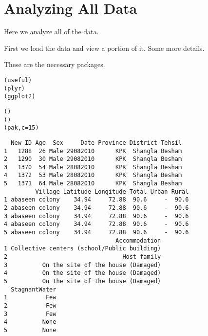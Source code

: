 \documentclass{article}
\title{\myTitle}
\author{Richard Garfield\\ Columbia University School of Nursing \and Jared P. Lander\\ JP Lander Consulting}
\begin{document}


\section{Analyzing All Data}
\label{sec:overall}
Here we analyze all of the data.

First we load the data and view a portion of it. Some more details.

These are the necessary packages.
\begin{knitrout}
\color{fgcolor}\begin{kframe}
\begin{alltt}
(useful)
(plyr)
(ggplot2)
\end{alltt}
\end{kframe}
\end{knitrout}


\begin{knitrout}
\color{fgcolor}\begin{kframe}
\begin{alltt}
()
()
(pak, c = 15)
\end{alltt}
\begin{verbatim}
  New_ID Age  Sex     Date Province District Tehsil
1   1288  26 Male 29082010      KPK  Shangla Besham
2   1290  30 Male 29082010      KPK  Shangla Besham
3   1370  54 Male 28082010      KPK  Shangla Besham
4   1372  53 Male 28082010      KPK  Shangla Besham
5   1371  64 Male 28082010      KPK  Shangla Besham
         Village Latitude Longitude Total Urban Rural
1 abaseen colony    34.94     72.88  90.6     -  90.6
2 abaseen colony    34.94     72.88  90.6     -  90.6
3 abaseen colony    34.94     72.88  90.6     -  90.6
4 abaseen colony    34.94     72.88  90.6     -  90.6
5 abaseen colony    34.94     72.88  90.6     -  90.6
                                Accommodation
1 Collective centers (school/Public building)
2                                 Host family
3          On the site of the house (Damaged)
4          On the site of the house (Damaged)
5          On the site of the house (Damaged)
  StagnantWater
1           Few
2           Few
3           Few
4          None
5          None
\end{verbatim}
\end{kframe}
\end{knitrout}
\end{document}
